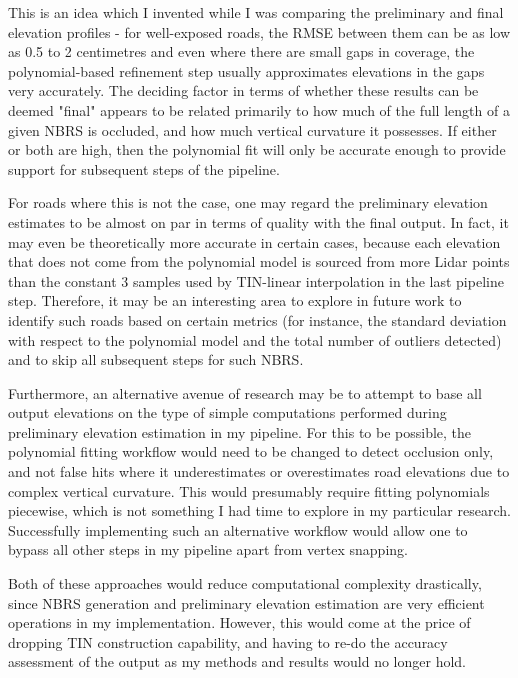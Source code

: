 This is an idea which I invented while I was comparing the preliminary and final elevation profiles - for well-exposed roads, the RMSE between them can be as low as 0.5 to 2 centimetres and even where there are small gaps in coverage, the polynomial-based refinement step usually approximates elevations in the gaps very accurately. The deciding factor in terms of whether these results can be deemed "final" appears to be related primarily to how much of the full length of a given NBRS is occluded, and how much vertical curvature it possesses. If either or both are high, then the polynomial fit will only be accurate enough to provide support for subsequent steps of the pipeline.

For roads where this is not the case, one may regard the preliminary elevation estimates to be almost on par in terms of quality with the final output. In fact, it may even be theoretically more accurate in certain cases, because each elevation that does not come from the polynomial model is sourced from more Lidar points than the constant 3 samples used by TIN-linear interpolation in the last pipeline step. Therefore, it may be an interesting area to explore in future work to identify such roads based on certain metrics (for instance, the standard deviation with respect to the polynomial model and the total number of outliers detected) and to skip all subsequent steps for such NBRS.

Furthermore, an alternative avenue of research may be to attempt to base all output elevations on the type of simple computations performed during preliminary elevation estimation in my pipeline. For this to be possible, the polynomial fitting workflow would need to be changed to detect occlusion only, and not false hits where it underestimates or overestimates road elevations due to complex vertical curvature. This would presumably require fitting polynomials piecewise, which is not something I had time to explore in my particular research. Successfully implementing such an alternative workflow would allow one to bypass all other steps in my pipeline apart from vertex snapping.

Both of these approaches would reduce computational complexity drastically, since NBRS generation and preliminary elevation estimation are very efficient operations in my implementation. However, this would come at the price of dropping TIN construction capability, and having to re-do the accuracy assessment of the output as my methods and results would no longer hold.

